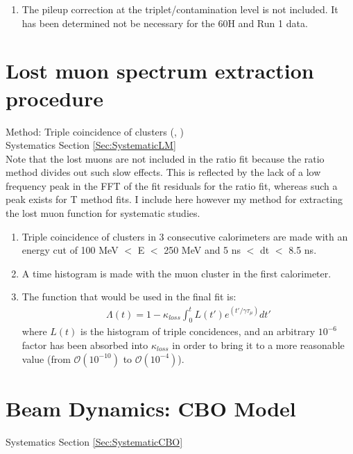 \begin{enumerate}
		\item{The pileup correction at the triplet/contamination level is not included. It has been determined not be necessary for the 60H and Run 1 data.}
	\end{enumerate}


\section{Lost muon spectrum extraction procedure}
\label{Sec:LM}

	Method: Triple coincidence of clusters (, \cite{MuonLosses}) \\
	\noindent Systematics Section \ref{Sec:SystematicLM} \\

	Note that the lost muons are not included in the ratio fit because the ratio method divides out such slow effects. This is reflected by the lack of a low frequency peak in the FFT of the fit residuals for the ratio fit, whereas such a peak exists for T method fits. I include here however my method for extracting the lost muon function for systematic studies.

	\begin{enumerate}
		\item{Triple coincidence of clusters in 3 consecutive calorimeters are made with an energy cut of 100 MeV $<$ E $<$ 250 MeV and 5 ns $<$ dt $<$ 8.5 ns.}
		\item{A time histogram is made with the muon cluster in the first calorimeter.}
		\item{The function that would be used in the final fit is:
			\begin{gather}
				\Lambda(t) = 1 - \kappa_{loss} \int_{0}^{t} L(t')e^{(t'/\gamma\tau_{\mu})} dt'
			\end{gather}
		where $L(t)$ is the histogram of triple concidences, and an arbitrary $10^{-6}$ factor has been absorbed into $\kappa_{loss}$ in order to bring it to a more reasonable value (from $\mathcal{O}(10^{-10})$ to $\mathcal{O}(10^{-4})$).}
	\end{enumerate}


\section{Beam Dynamics: CBO Model}
\label{Sec:CBO}

	\noindent Systematics Section \ref{Sec:SystematicCBO}

